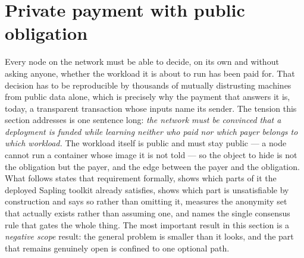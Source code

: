 \section{Private payment with public obligation}
\label{sec:private-payment}\label{sec:private-renewal}

Every node on the network must be able to decide, on its own and without asking anyone, whether the
workload it is about to run has been paid for. That decision has to be reproducible by thousands of
mutually distrusting machines from public data alone, which is precisely why the payment that answers
it is, today, a transparent transaction whose inputs name its sender. The tension this section
addresses is one sentence long: \emph{the network must be convinced that a deployment is funded while
learning neither who paid nor which payer belongs to which workload.} The workload itself is public
and must stay public --- a node cannot run a container whose image it is not told --- so the object to
hide is not the obligation but the payer, and the edge between the payer and the obligation. What
follows states that requirement formally, shows which parts of it the deployed Sapling toolkit already
satisfies, shows which part is unsatisfiable by construction and says so rather than omitting it,
measures the anonymity set that actually exists rather than assuming one, and names the single
consensus rule that gates the whole thing. The most important result in this section is a
\emph{negative scope} result: the general problem is smaller than it looks, and the part that remains
genuinely open is confined to one optional path.

